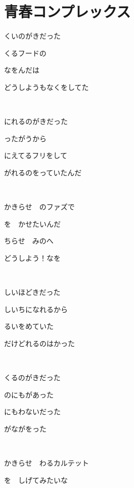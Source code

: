 \section{青春コンプレックス}

くいのがきだった

くるフードの

なをんだは

どうしようもなくをしてた

~

にれるのがきだった

ったがうから

にえてるフリをして

がれるのをっていたんだ

~

かきらせ　のファズで

を　かせたいんだ

ちらせ　みのへ

どうしよう！なを

~

しいほどきだった

しいちになれるから

るいをめていた

だけどれるのはかった

~

くるのがきだった

のにもがあった

にもわないだった

がながをった

~

かきらせ　わるカルテット

を　しげてみたいな

